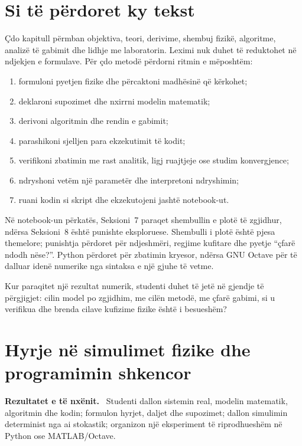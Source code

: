 \documentclass[11pt,oneside,openany]{book}
\newenvironment{qellime}{\par\medskip\noindent\textbf{Rezultatet e të nxënit.}\ }{\par\medskip}
\begin{document}
\chapter*{Si të përdoret ky tekst}
Çdo kapitull përmban objektiva, teori, derivime, shembuj fizikë, algoritme,
analizë të gabimit dhe lidhje me laboratorin. Leximi nuk duhet të reduktohet në
ndjekjen e formulave. Për çdo metodë përdorni ritmin e mëposhtëm:
\begin{enumerate}
\item formuloni pyetjen fizike dhe përcaktoni madhësinë që kërkohet;
\item deklaroni supozimet dhe nxirrni modelin matematik;
\item derivoni algoritmin dhe rendin e gabimit;
\item parashikoni sjelljen para ekzekutimit të kodit;
\item verifikoni zbatimin me rast analitik, ligj ruajtjeje ose studim konvergjence;
\item ndryshoni vetëm një parametër dhe interpretoni ndryshimin;
\item ruani kodin si skript dhe ekzekutojeni jashtë notebook-ut.
\end{enumerate}

Në notebook-un përkatës, Seksioni~7 paraqet shembullin e plotë të zgjidhur,
ndërsa Seksioni~8 është punishte eksploruese. Shembulli i plotë është pjesa
themelore; punishtja përdoret për ndjeshmëri, regjime kufitare dhe pyetje
``çfarë ndodh nëse?''. Python përdoret për zbatimin kryesor, ndërsa GNU Octave
për të dalluar idenë numerike nga sintaksa e një gjuhe të vetme.

Kur paraqitet një rezultat numerik, studenti duhet të jetë në gjendje të
përgjigjet: cilin model po zgjidhim, me cilën metodë, me çfarë gabimi, si u
verifikua dhe brenda cilave kufizime fizike është i besueshëm?

\tableofcontents
\mainmatter

\chapter{Hyrje në simulimet fizike dhe programimin shkencor}
\begin{qellime}
Studenti dallon sistemin real, modelin matematik, algoritmin dhe kodin; formulon hyrjet, daljet dhe supozimet; dallon simulimin determinist nga ai stokastik; organizon një eksperiment të riprodhueshëm në Python ose MATLAB/Octave.
\end{qellime}
\end{document}
